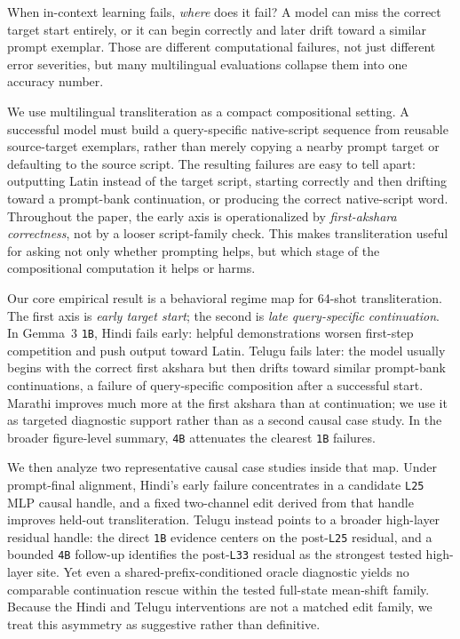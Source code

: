 \documentclass{article}
\begin{document}
When in-context learning fails, \emph{where} does it fail? A model can miss the correct target start entirely, or it can begin correctly and later drift toward a similar prompt exemplar. Those are different computational failures, not just different error severities, but many multilingual evaluations collapse them into one accuracy number.

We use multilingual transliteration as a compact compositional setting. A successful model must build a query-specific native-script sequence from reusable source-target exemplars, rather than merely copying a nearby prompt target or defaulting to the source script. The resulting failures are easy to tell apart: outputting Latin instead of the target script, starting correctly and then drifting toward a prompt-bank continuation, or producing the correct native-script word. Throughout the paper, the early axis is operationalized by \emph{first-akshara correctness}, not by a looser script-family check. This makes transliteration useful for asking not only whether prompting helps, but which stage of the compositional computation it helps or harms.

Our core empirical result is a behavioral regime map for 64-shot transliteration. The first axis is \emph{early target start}; the second is \emph{late query-specific continuation}. In Gemma~3 \texttt{1B}, Hindi fails early: helpful demonstrations worsen first-step competition and push output toward Latin. Telugu fails later: the model usually begins with the correct first akshara but then drifts toward similar prompt-bank continuations, a failure of query-specific composition after a successful start. Marathi improves much more at the first akshara than at continuation; we use it as targeted diagnostic support rather than as a second causal case study. In the broader figure-level summary, \texttt{4B} attenuates the clearest \texttt{1B} failures.

We then analyze two representative causal case studies inside that map. Under prompt-final alignment, Hindi's early failure concentrates in a candidate \texttt{L25} MLP causal handle, and a fixed two-channel edit derived from that handle improves held-out transliteration. Telugu instead points to a broader high-layer residual handle: the direct \texttt{1B} evidence centers on the post-\texttt{L25} residual, and a bounded \texttt{4B} follow-up identifies the post-\texttt{L33} residual as the strongest tested high-layer site. Yet even a shared-prefix-conditioned oracle diagnostic yields no comparable continuation rescue within the tested full-state mean-shift family. Because the Hindi and Telugu interventions are not a matched edit family, we treat this asymmetry as suggestive rather than definitive.
\end{document}
